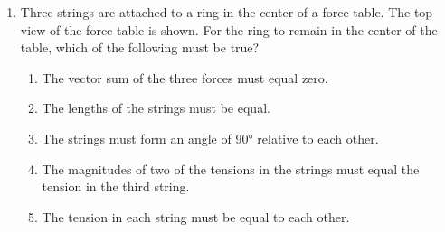 \documentclass{../../oss-apphys}
\begin{document}
\begin{multicols}{2}
\begin{enumerate}[resume,leftmargin=18pt]

  \item Three strings are attached to a ring in the center of a force table. The
    top view of the force table is shown. For the ring to remain in the
    center of the table, which of the following must be true?
    \begin{enumerate}[noitemsep,topsep=0pt,leftmargin=18pt,label=(\Alph*)]
    \item The vector sum of the three forces must equal zero.
    \item The lengths of the strings must be equal.
    \item The strings must form an angle of \ang{90} relative to each other.
    \item The magnitudes of two of the tensions in the strings must equal the
      tension in the third string.
    \item The tension in each string must be equal to each other.
    \end{enumerate}
%  
%
%

\end{enumerate}
\end{multicols}
\end{document}
